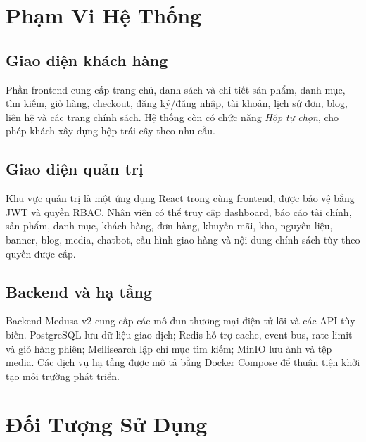 \section{Phạm Vi Hệ Thống}

\subsection{Giao diện khách hàng}

Phần frontend cung cấp trang chủ, danh sách và chi tiết sản phẩm, danh mục, tìm kiếm, giỏ hàng, checkout, đăng ký/đăng nhập, tài khoản, lịch sử đơn, blog, liên hệ và các trang chính sách. Hệ thống còn có chức năng \textit{Hộp tự chọn}, cho phép khách xây dựng hộp trái cây theo nhu cầu.

\subsection{Giao diện quản trị}

Khu vực quản trị là một ứng dụng React trong cùng frontend, được bảo vệ bằng JWT và quyền RBAC. Nhân viên có thể truy cập dashboard, báo cáo tài chính, sản phẩm, danh mục, khách hàng, đơn hàng, khuyến mãi, kho, nguyên liệu, banner, blog, media, chatbot, cấu hình giao hàng và nội dung chính sách tùy theo quyền được cấp.

\subsection{Backend và hạ tầng}

Backend Medusa v2 cung cấp các mô-đun thương mại điện tử lõi và các API tùy biến. PostgreSQL lưu dữ liệu giao dịch; Redis hỗ trợ cache, event bus, rate limit và giỏ hàng phiên; Meilisearch lập chỉ mục tìm kiếm; MinIO lưu ảnh và tệp media. Các dịch vụ hạ tầng được mô tả bằng Docker Compose để thuận tiện khởi tạo môi trường phát triển.

\section{Đối Tượng Sử Dụng}

